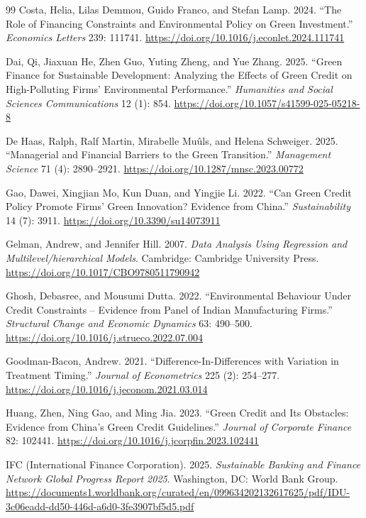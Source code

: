 \begin{thebibliography}{99}
Costa, Helia, Lilas Demmou, Guido Franco, and Stefan Lamp. 2024. ``The Role of Financing Constraints and Environmental Policy on Green Investment.'' \emph{Economics Letters} 239: 111741. \url{https://doi.org/10.1016/j.econlet.2024.111741}

Dai, Qi, Jiaxuan He, Zhen Guo, Yuting Zheng, and Yue Zhang. 2025. ``Green Finance for Sustainable Development: Analyzing the Effects of Green Credit on High-Polluting Firms' Environmental Performance.'' \emph{Humanities and Social Sciences Communications} 12 (1): 854. \url{https://doi.org/10.1057/s41599-025-05218-8}

De Haas, Ralph, Ralf Martin, Mirabelle Mu{\^u}ls, and Helena Schweiger. 2025. ``Managerial and Financial Barriers to the Green Transition.'' \emph{Management Science} 71 (4): 2890--2921. \url{https://doi.org/10.1287/mnsc.2023.00772}

Gao, Dawei, Xingjian Mo, Kun Duan, and Yingjie Li. 2022. ``Can Green Credit Policy Promote Firms' Green Innovation? Evidence from {China}.'' \emph{Sustainability} 14 (7): 3911. \url{https://doi.org/10.3390/su14073911}

Gelman, Andrew, and Jennifer Hill. 2007. \emph{Data Analysis Using Regression and Multilevel/hierarchical Models}. Cambridge: Cambridge University Press. \url{https://doi.org/10.1017/CBO9780511790942}

Ghosh, Debasree, and Mousumi Dutta. 2022. ``Environmental Behaviour Under Credit Constraints -- Evidence from Panel of {Indian} Manufacturing Firms.'' \emph{Structural Change and Economic Dynamics} 63: 490--500. \url{https://doi.org/10.1016/j.strueco.2022.07.004}

Goodman-Bacon, Andrew. 2021. ``Difference-In-Differences with Variation in Treatment Timing.'' \emph{Journal of Econometrics} 225 (2): 254--277. \url{https://doi.org/10.1016/j.jeconom.2021.03.014}

Huang, Zhen, Ning Gao, and Ming Jia. 2023. ``Green Credit and Its Obstacles: Evidence from {China}'s Green Credit Guidelines.'' \emph{Journal of Corporate Finance} 82: 102441. \url{https://doi.org/10.1016/j.jcorpfin.2023.102441}

IFC (International Finance Corporation). 2025. \emph{{Sustainable Banking and Finance Network} Global Progress Report 2025}. Washington, DC: World Bank Group. \url{https://documents1.worldbank.org/curated/en/099634202132617625/pdf/IDU-3c06eadd-dd50-446d-a6d0-3fe3907bf5d5.pdf}


\end{thebibliography}
